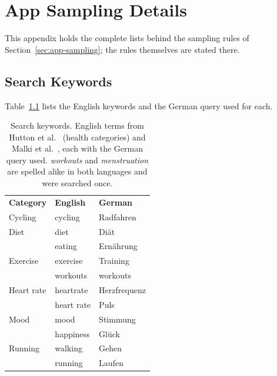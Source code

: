 \chapter{App Sampling Details}
\label{app:app-sample}
\label{app:sampling-details}
This appendix holds the complete lists behind the sampling rules of
Section~\ref{sec:app-sampling}; the rules themselves are stated there.

\section{Search Keywords}
Table~\ref{tab:keywords} lists the English keywords and the German
query used for each.

\begin{table}[H]
\centering
\begin{singlespace}
\caption[Search keywords]{Search keywords. English terms from Hutton et
al.~\parencite[Table~2]{hutton2018assessing} (health categories) and Malki et
al.~\parencite[\S3.1]{malki2024exploring}, each with the German query used.
\emph{workouts} and \emph{menstruation} are spelled alike in both languages and
were searched once.}
\label{tab:keywords}
\small
\setlength{\aboverulesep}{0.25ex}\setlength{\belowrulesep}{0.35ex}
\begin{tabularx}{\textwidth}{@{}>{\raggedright\arraybackslash}p{3.2cm}>{\raggedright\arraybackslash}X>{\raggedright\arraybackslash}X@{}}
\toprule
 & \multicolumn{2}{c}{\textbf{Keywords}} \\
\cmidrule(lr){2-3}
\textbf{Category} & \textbf{English} & \textbf{German} \\
\midrule
Cycling & cycling & Radfahren \\
\addlinespace
Diet & diet & Diät \\
 & eating & Ernährung \\
\addlinespace
Exercise & exercise & Training \\
 & workouts & workouts \\
\addlinespace
Heart rate & heartrate & Herzfrequenz \\
 & heart rate & Puls \\
\addlinespace
Mood & mood & Stimmung \\
 & happiness & Glück \\
\addlinespace
Running & walking & Gehen \\
 & running & Laufen \\

\end{tabularx}
\end{singlespace}
\end{table}
